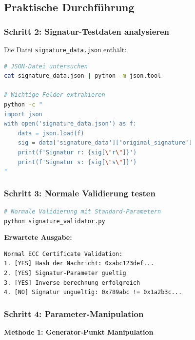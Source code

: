 \documentclass{article}
\begin{document}
\subsection{Praktische Durchführung}

\subsubsection{Schritt 2: Signatur-Testdaten analysieren}

Die Datei \texttt{signature\_data.json} enthält:

\begin{lstlisting}[language=bash, caption=Analyse der Testdaten]
# JSON-Datei untersuchen
cat signature_data.json | python -m json.tool

# Wichtige Felder extrahieren
python -c "
import json
with open('signature_data.json') as f:
    data = json.load(f)
    sig = data['signature_data']['original_signature']
    print(f'Signatur r: {sig[\"r\"]}')
    print(f'Signatur s: {sig[\"s\"]}')
"
\end{lstlisting}

\subsubsection{Schritt 3: Normale Validierung testen}

\begin{lstlisting}[language=bash, caption=Baseline-Validierung]
# Normale Validierung mit Standard-Parametern
python signature_validator.py
\end{lstlisting}

\textbf{Erwartete Ausgabe:}
\begin{lstlisting}[caption=Normale Validierung]
Normal ECC Certificate Validation:
1. [YES] Hash der Nachricht: 0xabc123def...
2. [YES] Signatur-Parameter gueltig
3. [YES] Inverse berechnung erfolgreich  
4. [NO] Signatur ungueltig: 0x789abc != 0x1a2b3c...
\end{lstlisting}

\subsubsection{Schritt 4: Parameter-Manipulation}

\textbf{Methode 1: Generator-Punkt Manipulation}
\end{document}
